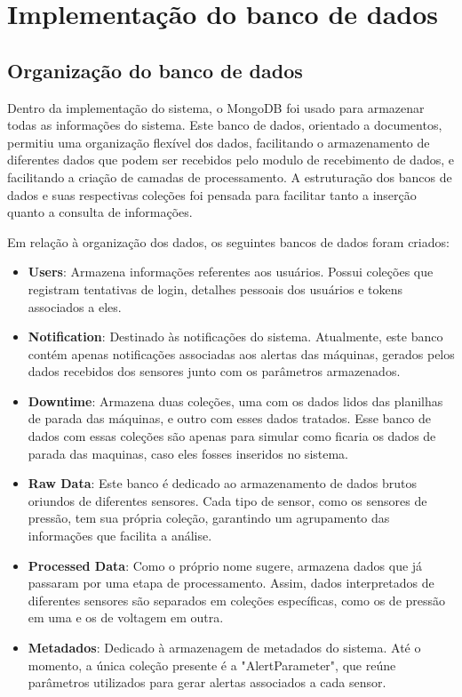 \section[Implementação do banco de dados]{Implementação do banco de dados}


\subsection[Organização do banco de dados]{Organização do banco de dados}

Dentro da implementação do sistema, o MongoDB foi usado para armazenar todas as informações do sistema. Este banco de dados, orientado a documentos, permitiu uma organização flexível dos dados, facilitando o armazenamento de diferentes dados que podem ser recebidos pelo modulo de recebimento de dados, e facilitando a criação de camadas de processamento. A estruturação dos bancos de dados e suas respectivas coleções foi pensada para facilitar tanto a inserção quanto a consulta de informações.

Em relação à organização dos dados, os seguintes bancos de dados foram criados:

\begin{itemize}
    \item \textbf{Users}: Armazena informações referentes aos usuários. Possui coleções que registram tentativas de login, detalhes pessoais dos usuários e tokens associados a eles.
    
    \item \textbf{Notification}: Destinado às notificações do sistema. Atualmente, este banco contém apenas notificações associadas aos alertas das máquinas, gerados pelos dados recebidos dos sensores junto com os parâmetros armazenados.
    
    \item \textbf{Downtime}: Armazena duas coleções, uma com os dados lidos das planilhas de parada das máquinas, e outro com esses dados tratados. Esse banco de dados com essas coleções são apenas para simular como ficaria os dados de parada das maquinas, caso eles fosses inseridos no sistema.
    
    \item \textbf{Raw Data}: Este banco é dedicado ao armazenamento de dados brutos oriundos de diferentes sensores. Cada tipo de sensor, como os sensores de pressão, tem sua própria coleção, garantindo um agrupamento das informações que facilita a análise.
    
    \item \textbf{Processed Data}: Como o próprio nome sugere, armazena dados que já passaram por uma etapa de processamento. Assim, dados interpretados de diferentes sensores são separados em coleções específicas, como os de pressão em uma e os de voltagem em outra.
    
    \item \textbf{Metadados}: Dedicado à armazenagem de metadados do sistema. Até o momento, a única coleção presente é a "AlertParameter", que reúne parâmetros utilizados para gerar alertas associados a cada sensor.
\end{itemize}

